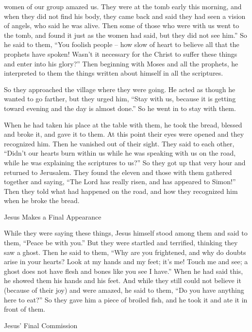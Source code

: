 {women
of our
group amazed
us.
They were
at
the tomb
early
this morning,
and
when
they did
not
find
his
body,
they came back
and
said
they had seen
a vision
of angels,
who
said
he
was alive.
Then
some
of those who were with
us
went
to
the tomb,
and
found
it just as
the women
had said,
but
they did
not
see
him.”
So
he
said
to
them,
“You foolish people –
how slow
of heart
to believe
all
that
the prophets
have spoken!
Wasn’t
it necessary
for the Christ
to suffer
these things
and
enter
into
his
glory?”
Then
beginning
with
Moses
and
all
the prophets,
he interpreted
to them
the things written about
himself
in
all
the scriptures.
\par }{\PP {}So
they approached
the village
where
they were going.
He acted as though
he wanted to go
farther,
but
they urged
him, “Stay
with
us,
because
it is
getting toward
evening
and
the day
is almost done.”
So
he went in
to stay
with
them.
\par }{\PP {}When
he had taken
his
place at the table
with
them,
he took
the bread,
blessed
and
broke
it, and gave
it to them.
At this point
their
eyes
were opened
and
they recognized
him.
Then
he
vanished
out of
their sight.
They said
to
each other,
“Didn’t
our
hearts
burn
within us
while
he was speaking
with us
on
the road,
while
he was explaining
the scriptures
to us?”
So
they got up
that very hour
and returned
to
Jerusalem.
They found
the eleven
and
those with
them
gathered together
and saying,
“The Lord
has really
risen,
and
has appeared
to Simon!”
Then
they
told
what had happened on
the road,
and
how
they recognized
him
when he broke
the bread.
\par }{\SH Jesus Makes a Final Appearance
\par }{\PP {}While
they
were saying
these things,
Jesus himself
stood
among
them
and
said
to them,
“Peace
be with you.”
But
they were startled
and
terrified,
thinking
they saw
a ghost.
Then
he said
to them,
“Why
are you
frightened,
and
why
do
doubts
arise
in
your
hearts?
Look at
my
hands
and
my
feet;
it’s
me! Touch
me
and
see;
a ghost
does
not
have
flesh
and
bones
like
you see
I
have.”
When
he had said
this,
he showed
them
his hands
and
his feet.
And
while they
still
could not believe
it (because of
their joy) and
were amazed,
he said
to them,
“Do you have
anything
here
to eat?”
So
they gave
him
a piece
of broiled
fish,
and
he took
it and ate
it in front of
them.
\par }{\SH Jesus’ Final Commission
}
